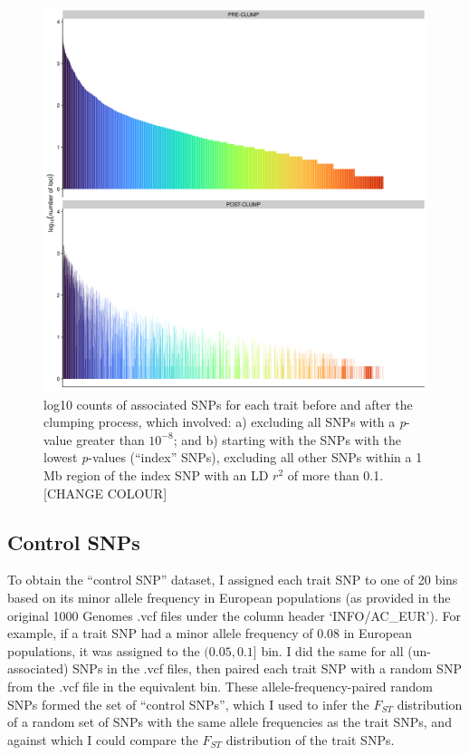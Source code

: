 \documentclass[
]{book}
\begin{document}
\begin{figure}
\includegraphics[width=1\linewidth]{figs/fst/0.1_1000_20220314_snp_counts} \caption{log10 counts of associated SNPs for each trait before and after the clumping process, which involved: a) excluding all SNPs with a \emph{p}-value greater than \(10^{-8}\); and b) starting with the SNPs with the lowest \emph{p}-values (``index'' SNPs), excluding all other SNPs within a 1 Mb region of the index SNP with an LD \(r^2\) of more than 0.1. {[}CHANGE COLOUR{]}}\label{fig:FstSnpCount}
\end{figure}

\hypertarget{control-snps}{%
\subsection{Control SNPs}\label{control-snps}}

To obtain the ``control SNP'' dataset, I assigned each trait SNP to one of 20 bins based on its minor allele frequency in European populations (as provided in the original 1000 Genomes .vcf files under the column header `INFO/AC\_EUR'). For example, if a trait SNP had a minor allele frequency of 0.08 in European populations, it was assigned to the \((0.05, 0.1]\) bin. I did the same for all (un-associated) SNPs in the .vcf files, then paired each trait SNP with a random SNP from the .vcf file in the equivalent bin. These allele-frequency-paired random SNPs formed the set of ``control SNPs'', which I used to infer the \(F_{ST}\) distribution of a random set of SNPs with the same allele frequencies as the trait SNPs, and against which I could compare the \(F_{ST}\) distribution of the trait SNPs.
\end{document}
